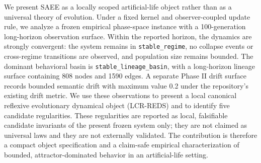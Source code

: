 We present SAEE as a locally scoped artificial-life object rather than as a
universal theory of evolution. Under a fixed kernel and observer-coupled update
rule, we analyze a frozen empirical phase-space instance with a 100-generation
long-horizon observation surface. Within the reported horizon, the dynamics are
strongly convergent: the system remains in \texttt{stable\_regime}, no collapse
events or cross-regime transitions are observed, and population size remains
bounded. The dominant behavioral basin is
\texttt{stable\_lineage\_basin}, with a long-horizon lineage surface
containing 808 nodes and 1590 edges. A separate Phase II drift surface records
bounded semantic drift with maximum value 0.2 under the repository's existing
drift metric. We use these observations to present a local canonical reflexive
evolutionary dynamical object (LCR-REDS) and to identify five candidate regularities.
These regularities are reported as local, falsifiable candidate
invariants of the present frozen system only; they are not claimed as
universal laws and they are not externally validated. The contribution is
therefore a compact object specification and a claim-safe empirical
characterization of bounded, attractor-dominated behavior in an artificial-life
setting.
